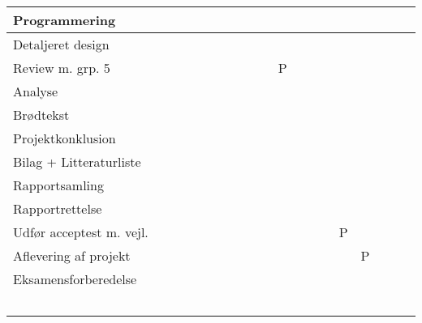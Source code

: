 \documentclass[12pt, letterpaper]{article}
\begin{document}
\begin{table}[]
\begin{tabular}{|l|l|l|l|l|l|l|l|l|l|l|l|l|l|l|l|l|l|l|}
Programmering           &    &    &    &    &    &    &    &    &    &    &    &    &    &    &    &  &  &  \\ \hline
Detaljeret design       &    &    &    &    &    &    &    &    &    &    &    &    &    &    &    &  &  &  \\ \hline
Review m. grp. 5       &    &    &    &    &    &    &    &    &    &  P  &    &    &    &    &    &  &  &  \\ \hline
Analyse                 &    &    &    &    &    &    &    &    &    &    &    &    &    &    &    &  &  &  \\ \hline
Brødtekst               &    &    &    &    &    &    &    &    &    &    &    &    &    &    &    &  &  &  \\ \hline
Projektkonklusion       &    &    &    &    &    &    &    &    &    &    &    &    &    &    &    &  &  &  \\ \hline
Bilag + Litteraturliste &    &    &    &    &    &    &    &    &    &    &    &    &    &    &    &  &  &  \\ \hline
Rapportsamling          &    &    &    &    &    &    &    &    &    &    &    &    &    &    &    &  &  &  \\ \hline
Rapportrettelse         &    &    &    &    &    &    &    &    &    &    &    &    &    &    &    &  &  &  \\ \hline
Udfør acceptest m. vejl.&    &    &    &    &    &    &    &    &    &    &    &    &    & P   &    &  &  &  \\ \hline
Aflevering af projekt   &    &    &    &    &    &    &    &    &    &    &    &    &    &    &  P   &  &  &  \\ \hline
Eksamensforberedelse    &    &    &    &    &    &    &    &    &    &    &    &    &    &    &    &  &  &  \\ \hline
                        &    &    &    &    &    &    &    &    &    &    &    &    &    &    &    &  &  &  \\ \hline
                        &    &    &    &    &    &    &    &    &    &    &    &    &    &    &    &  &  &  \\ \hline
                        &    &    &    &    &    &    &    &    &    &    &    &    &    &    &    &  &  &  \\ \hline
                        &    &    &    &    &    &    &    &    &    &    &    &    &    &    &    &  &  &  \\ \hline
                        &    &    &    &    &    &    &    &    &    &    &    &    &    &    &    &  &  &  \\ \hline
\end{tabular}
\end{table}
\end{document}
